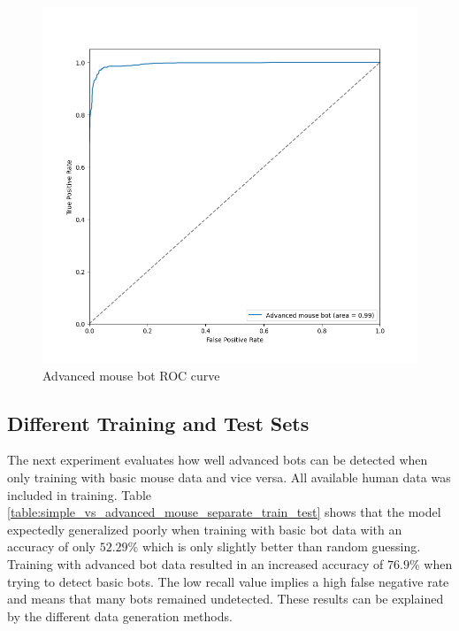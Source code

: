 \documentclass[
    fontsize=12pt,
    headings=small,
    parskip=half,           %
    bibliography=totoc,
    numbers=noenddot,       %
    open=any,               %
    final,                   %
    table
]{scrreprt}
\begin{document}
\begin{figure}[H]
    \includegraphics[width=\textwidth]{figures/mouse_advanced_roc.png}
    \caption{Advanced mouse bot ROC curve}
    \label{fig:mouse_advanced_roc}
\end{figure}

\subsection{Different Training and Test Sets}

The next experiment evaluates how well advanced bots can be detected when only training with basic mouse data and vice versa. All available human data was included in training. Table \ref{table:simple_vs_advanced_mouse_separate_train_test} shows that the model expectedly generalized poorly when training with basic bot data with an accuracy of only $52.29\%$ which is only slightly better than random guessing. Training with advanced bot data resulted in an increased accuracy of $76.9\%$ when trying to detect basic bots. The low recall value implies a high false negative rate and means that many bots remained undetected. These results can be explained by the different data generation methods.
\end{document}
